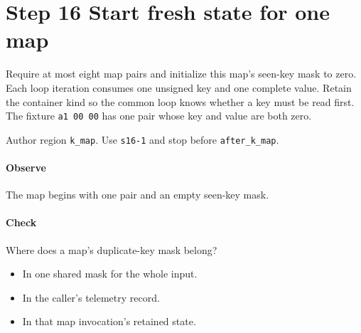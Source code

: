 \section{Step 16 Start fresh state for one map}\label{cbor-s16}
Require at most eight map pairs and initialize this map's seen-key mask to zero. Each loop iteration consumes one unsigned key and one complete value. Retain the container kind so the common loop knows whether a key must be read first. The fixture \texttt{a1 00 00} has one pair whose key and value are both zero.

Author region \texttt{k\_map}. Use \texttt{s16-1} and stop before \texttt{after\_k\_map}.

\paragraph{Observe} The map begins with one pair and an empty seen-key mask.

\paragraph{Check} Where does a map's duplicate-key mask belong?
\begin{itemize}
  \item[A.] In one shared mask for the whole input.
  \item[B.] In the caller's telemetry record.
  \item[C.] In that map invocation's retained state.
\end{itemize}
